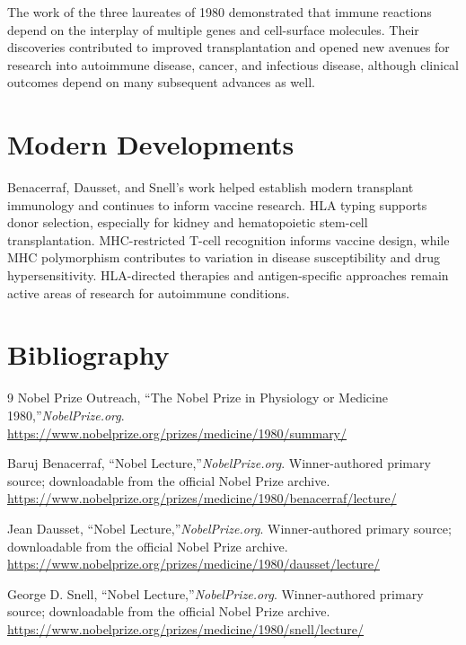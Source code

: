 The work of the three laureates of 1980 demonstrated that immune reactions depend on the interplay of multiple genes and cell-surface molecules. Their discoveries contributed to improved transplantation and opened new avenues for research into autoimmune disease, cancer, and infectious disease, although clinical outcomes depend on many subsequent advances as well.


\section{Modern Developments}

Benacerraf, Dausset, and Snell's work helped establish modern transplant immunology and continues to inform vaccine research. HLA typing supports donor selection, especially for kidney and hematopoietic stem-cell transplantation. MHC-restricted T-cell recognition informs vaccine design, while MHC polymorphism contributes to variation in disease susceptibility and drug hypersensitivity. HLA-directed therapies and antigen-specific approaches remain active areas of research for autoimmune conditions.


\section{Bibliography}

\begin{thebibliography}{9}
Nobel Prize Outreach, ``The Nobel Prize in Physiology or Medicine 1980,''\emph{NobelPrize.org}.\\
\url{https://www.nobelprize.org/prizes/medicine/1980/summary/}

Baruj Benacerraf, ``Nobel Lecture,''\emph{NobelPrize.org}. Winner-authored primary source; downloadable from the official Nobel Prize archive.\\
\url{https://www.nobelprize.org/prizes/medicine/1980/benacerraf/lecture/}

Jean Dausset, ``Nobel Lecture,''\emph{NobelPrize.org}. Winner-authored primary source; downloadable from the official Nobel Prize archive.\\
\url{https://www.nobelprize.org/prizes/medicine/1980/dausset/lecture/}

George D. Snell, ``Nobel Lecture,''\emph{NobelPrize.org}. Winner-authored primary source; downloadable from the official Nobel Prize archive.\\
\url{https://www.nobelprize.org/prizes/medicine/1980/snell/lecture/}
\end{thebibliography}
